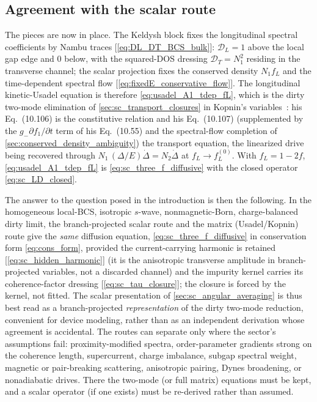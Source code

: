 \documentclass[
  aps,
  prb,
  preprint,
  superscriptaddress,
  longbibliography,
  nofootinbib
]{revtex4-2}
\newcommand{\DOS}{N_1}
\newcommand{\fL}{f_L}
\begin{document}
\subsection{Agreement with the scalar route}

The pieces are now in place. The Keldysh block fixes the longitudinal
spectral coefficients by Nambu traces [\cref{eq:DL_DT_BCS_bulk}]:
\(\mathcal D_L=1\) above the local gap edge and \(0\) below, with the
squared-DOS dressing \(\mathcal D_T=\DOS^2\) residing in the transverse
channel; the scalar projection fixes the conserved density \(\DOS\fL\)
and the time-dependent spectral flow
[\cref{eq:fixedE_conservative_flow}]. The longitudinal kinetic-Usadel
equation is therefore \cref{eq:usadel_A1_tdep_fL}, which is the dirty
two-mode elimination of \cref{sec:sc_transport_closures} in Kopnin's
variables~\cite{kopnin2001}: his Eq.~(10.106) is the constitutive relation and his
Eq.~(10.107) (supplemented by the \(g_-\partial f_1/\partial t\) term
of his Eq.~(10.55) and the spectral-flow completion of
\cref{sec:conserved_density_ambiguity}) the transport equation, the
linearized drive being recovered through
\(\DOS\,(\Delta/E)\dot\Delta=N_2\dot\Delta\) at \(\fL\to\fL^{(0)}\).
With \(\fL=1-2f\), \cref{eq:usadel_A1_tdep_fL} is
\cref{eq:sc_three_f_diffusive} with the closed operator
\cref{eq:sc_LD_closed}.

The answer to the question posed in the introduction is then the
following. In the homogeneous local-BCS, isotropic \(s\)-wave,
nonmagnetic-Born, charge-balanced dirty limit, the branch-projected
scalar route and the matrix (Usadel/Kopnin) route give the \emph{same}
diffusion equation, \cref{eq:sc_three_f_diffusive} in conservation
form \cref{eq:cons_form}, provided the current-carrying harmonic is
retained [\cref{eq:sc_hidden_harmonic}] (it is the anisotropic
transverse amplitude in branch-projected variables, not a discarded
channel) and the impurity kernel carries its coherence-factor
dressing [\cref{eq:sc_tau_closure}]; the closure is forced by the
kernel, not fitted. The scalar presentation of
\cref{sec:sc_angular_averaging} is thus best read as a
branch-projected \emph{representation} of the dirty two-mode
reduction, convenient for device modeling, rather than as an
independent derivation whose agreement is accidental. The routes can
separate only where the sector's assumptions fail: proximity-modified
spectra, order-parameter gradients strong on the coherence length,
supercurrent, charge imbalance, subgap spectral weight, magnetic or
pair-breaking scattering, anisotropic pairing, Dynes broadening, or
nonadiabatic drives. There the two-mode (or full matrix) equations
must be kept, and a scalar operator (if one exists) must be
re-derived rather than assumed.
\end{document}
